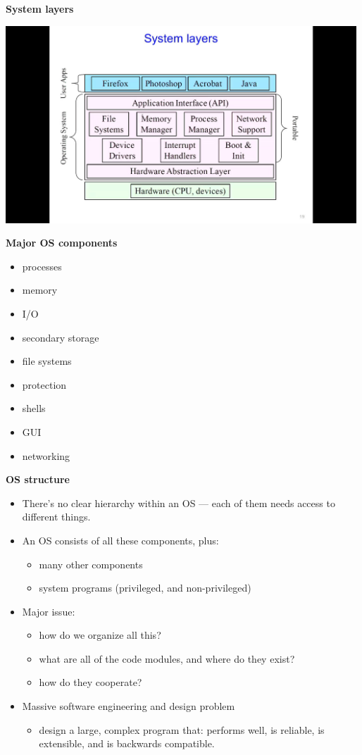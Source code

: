 \documentclass[11pt,a4paper]{article}
\begin{document}
\textbf{System layers}
\begin{center}{}
    \includegraphics[height=280]{system-layers.jpg}
\end{center}

\textbf{Major OS components}
\begin{itemize}
    \item processes
    \item memory
    \item I/O
    \item secondary storage
    \item file systems
    \item protection
    \item shells
    \item GUI
    \item networking
\end{itemize}

\textbf{OS structure}

\begin{itemize}
    \item There's no clear hierarchy within an OS --- each of them needs access to different
        things.
    \item An OS consists of all these components, plus:
        \begin{itemize}
            \item many other components
            \item system programs (privileged, and non-privileged)
        \end{itemize}
    \item Major issue:
        \begin{itemize}
            \item how do we organize all this?
            \item what are all of the code modules, and where do they exist?
            \item how do they cooperate?
        \end{itemize}
    \item Massive software engineering and design problem
        \begin{itemize}
            \item design a large, complex program that:
                performs well, is reliable, is extensible, and is backwards compatible.
        \end{itemize}
\end{itemize}
\end{document}
